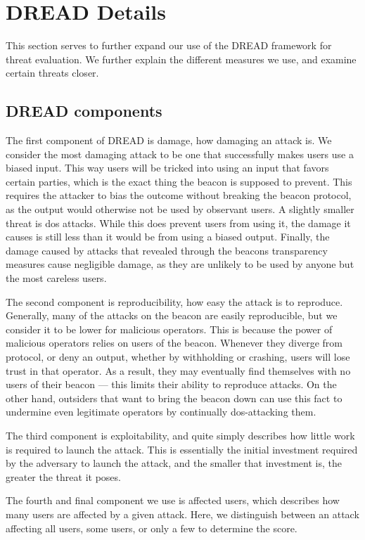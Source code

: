 \section{DREAD Details}\label{app:dread}
This section serves to further expand our use of the DREAD framework for threat evaluation. We further explain the different measures we use, and examine certain threats closer.

\subsection{DREAD components}
The first component of DREAD is damage, how damaging an attack is. We consider the most damaging attack to be one that successfully makes users use a biased input. This way users will be tricked into using an input that favors certain parties, which is the exact thing the beacon is supposed to prevent. This requires the attacker to bias the outcome without breaking the beacon protocol, as the output would otherwise not be used by observant users.
A slightly smaller threat is \acrshort{dos} attacks. While this does prevent users from using it, the damage it causes is still less than it would be from using a biased output.
Finally, the damage caused by attacks that revealed through the beacons transparency measures cause negligible damage, as they are unlikely to be used by anyone but the most careless users.

The second component is reproducibility, how easy the attack is to reproduce. Generally, many of the attacks on the beacon are easily reproducible, but we consider it to be lower for malicious operators. This is because the power of malicious operators relies on users of the beacon. Whenever they diverge from protocol, or deny an output, whether by withholding or crashing, users will lose trust in that operator. As a result, they may eventually find themselves with no users of their beacon --- this limits their ability to reproduce attacks.
On the other hand, outsiders that want to bring the beacon down can use this fact to undermine even legitimate operators by continually \acrshort{dos}-attacking them.

The third component is exploitability, and quite simply describes how little work is required to launch the attack. This is essentially the initial investment required by the adversary to launch the attack, and the smaller that investment is, the greater the threat it poses.

The fourth and final component we use is affected users, which describes how many users are affected by a given attack. Here, we distinguish between an attack affecting all users, some users, or only a few to determine the score.

